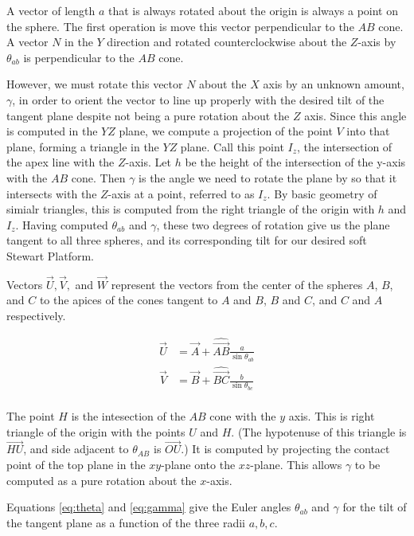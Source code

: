 \documentclass{article}
\begin{document}
A vector of length $a$ that is always rotated about the origin is always a point on the sphere.
The first operation is move this vector perpendicular to the $AB$ cone.
A vector $N$ in the $Y$ direction and rotated counterclockwise
about the $Z$-axis by $\theta_{ab}$ is perpendicular to the $AB$ cone.

However, we must rotate this vector $N$ about the $X$ axis by an unknown amount, $\gamma$, in order
to orient the vector to line up properly with the desired tilt of the tangent plane despite not being a pure rotation about the $Z$ axis. Since this angle is computed in the $YZ$ plane, we compute a projection of the point $V$ into
that plane, forming a triangle in the $YZ$ plane.  Call this point $I_z$, the intersection
of the apex line with the $Z$-axis. Let $h$ be the height of the intersection of the y-axis with the $AB$ cone.
Then $\gamma$ is the angle we need to rotate the plane by so that it intersects with the $Z$-axis at a point, referred to as $I_z$. By basic geometry of simialr triangles, this is computed from the right triangle of the origin with $h$ and $I_z$.
Having computed $\theta_{ab}$ and $\gamma$, these two degrees of rotation give us the plane tangent to all three spheres, and its corresponding tilt for our desired soft Stewart Platform.

Vectors $\overrightarrow{U}, \overrightarrow{V}, $ and $  \overrightarrow{W}$ represent the vectors from the center of the spheres $A$, $B$, and $C$ to
the apices of the cones tangent to $A$ and $B$, $B$ and $C$, and $C$ and $A$ respectively.


\begin{align}
  \overrightarrow{U} &= \overrightarrow{A} + \hat{\overrightarrow{AB}} \frac{a}{\sin{\theta_{ab}}} \\
  \overrightarrow{V} &= \overrightarrow{B} + \hat{\overrightarrow{BC}} \frac{b}{\sin{\theta_{bc}}} \\
\end{align}

The point $H$ is the intesection of the $AB$ cone with the $y$ axis.
This is right triangle of the origin with the points $U$ and $H$. (The hypotenuse
of this triangle is $\overrightarrow{HU}$, and side adjacent to $\theta_{AB}$ is $\overrightarrow{OU}$.)
It is computed by projecting the contact point of the top plane in the $xy$-plane
onto the $xz$-plane. This allows $\gamma$ to be computed as a pure rotation
about the $x$-axis.


Equations \ref{eq:theta} and \ref{eq:gamma} give the Euler angles
$\theta_{ab}$ and $\gamma$
for the tilt of the
tangent plane as a function of the three radii $a,b,c$.
\end{document}
